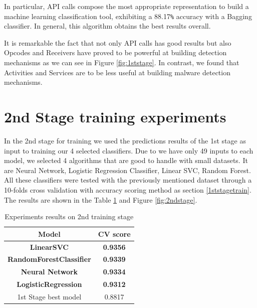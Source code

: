  In particular, API
calls compose the most appropriate representation to build a machine learning classification
tool, exhibiting a 88.17\verb+%+ accuracy with a Bagging classifier. In general,
this algorithm obtains the best results overall.

It is remarkable the fact that not only API calls has good results but also Opcodes and Receivers have proved to be powerful at building detection mechanisms as we can see in Figure \ref{fig:1ststage}. In contrast, we found that Activities and Services are to be less useful at building malware detection mechanisms.

\section{2nd Stage training experiments}

In the 2nd stage for training we used the predictions results of the 1st stage as input to training our 4 selected classifiers. Due to we have only 49 inputs to each model, we selected 4 algorithms that are good to handle with small datasets. It are Neural Network, Logistic Regression Classifier, Linear SVC, Random Forest.
All these classifiers were tested with the previously mentioned dataset through a 10-folds cross validation with accuracy scoring method as section \ref{1ststagetrain}.
The results are shown in the Table \ref{table:2ndstage} and Figure \ref{fig:2ndstage}.


\begin{table}[htbp]
    \centering
    \caption{Experiments results on 2nd training stage}
    \label{table:2ndstage}
        
        \begin{tabular}{|cc|}
            \hline
            
            \textbf{Model} & \textbf{CV score} \\ \hline
            \textbf{LinearSVC} & \textbf{0.9356} \\ \hline
            \textbf{RandomForestClassifier} & \textbf{0.9339} \\ \hline
            \textbf{Neural Network} & \textbf{0.9334} \\ \hline
            \textbf{LogisticRegression} & \textbf{0.9312} \\ \hline
            1st Stage best model & 0.8817 \\ \hline
            
            \end{tabular}
    \end{table}

